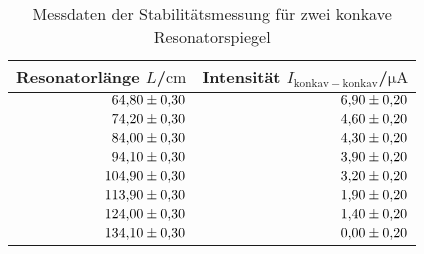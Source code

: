 \begin{table}
 \caption{Messdaten der Stabilitätsmessung für zwei konkave Resonatorspiegel}
 \label{tab:stabilitaetkk}
 \centering
{} \begin{tabular}{rr}
 \toprule 
    {Resonatorlänge $ L$/$\si{\centi\meter}$}& {Intensität $I_{\mathrm{konkav-konkav}}$/$\si{\micro\ampere}$} \\
     \midrule
     $\num{64.80 \pm 0.30}$ & $\num{6.90\pm0.20}$ \\
     $\num{74.20 \pm 0.30}$ & $\num{4.60\pm0.20}$ \\
     $\num{84.00 \pm 0.30}$ & $\num{4.30\pm0.20}$ \\
     $\num{94.10 \pm 0.30}$ & $\num{3.90\pm0.20}$ \\
     $\num{104.90 \pm 0.30}$ & $\num{3.20\pm0.20}$ \\
     $\num{113.90 \pm 0.30}$ & $\num{1.90\pm0.20}$ \\
     $\num{124.00 \pm 0.30}$ & $\num{1.40\pm0.20}$ \\
     $\num{134.10 \pm 0.30}$ & $\num{0.00\pm0.20}$ \\
 \bottomrule
 \end{tabular}
\end{table}